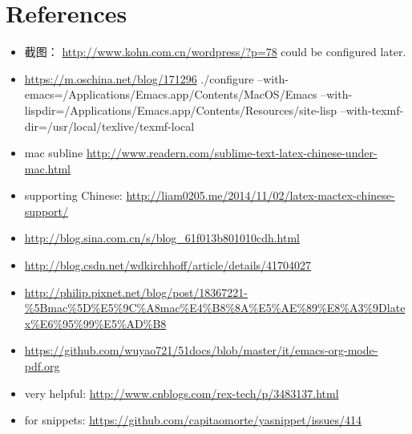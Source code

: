 \documentclass[9pt,b5paper]{article}
\begin{document}
\section{References}
\label{sec-2}
\begin{itemize}
\item 截图： \url{http://www.kohn.com.cn/wordpress/?p=78} could be configured later.
\item \url{https://m.oschina.net/blog/171296} ./configure --with-emacs=/Applications/Emacs.app/Contents/MacOS/Emacs --with-lispdir=/Applications/Emacs.app/Contents/Resources/site-lisp --with-texmf-dir=/usr/local/texlive/texmf-local
\item mac subline \url{http://www.readern.com/sublime-text-latex-chinese-under-mac.html}
\item supporting Chinese: \url{http://liam0205.me/2014/11/02/latex-mactex-chinese-support/}
\item \url{http://blog.sina.com.cn/s/blog_61f013b801010cdh.html}
\item \url{http://blog.csdn.net/wdkirchhoff/article/details/41704027}
\item \url{http://philip.pixnet.net/blog/post/18367221-\%5Bmac\%5D\%E5\%9C\%A8mac\%E4\%B8\%8A\%E5\%AE\%89\%E8\%A3\%9Dlatex\%E6\%95\%99\%E5\%AD\%B8}
\item \url{https://github.com/wuyao721/51docs/blob/master/it/emacs-org-mode-pdf.org}
\item very helpful: \url{http://www.cnblogs.com/rex-tech/p/3483137.html}
\item for snippets: \url{https://github.com/capitaomorte/yasnippet/issues/414}
\end{itemize}
\end{document}
